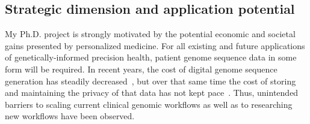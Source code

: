 \documentclass[a4paper,11pt]{article}
\begin{document}
\begin{refsection}
\section{Strategic dimension and application potential}
\begin{comment}
Elaborate the strategic dimension of your research, with regard to the 
(long-term) potential for innovative applications. 
Substantiate the PhD project’s strategic focus on economically relevant innovations. 

Justify how the chosen research approach (if successful) is the appropriate one to achieve the anticipated application(s) (potentially long term).

Elaborate the strategic importance of the potential applications to possible users (impact). 
Show how (if the project is successful) new products, services and/or processes may affect business of specific companies, a collective of companies and/or a sector and/or may be closely aligned with the Flemish science, technology and innovation transition priorities  (Flanders in transition. Priorities in Science, Technology and Innovation towards 2025) (socio-economic benefits). 

Societal impact should always be linked to a (in)direct (macro)economic benefit, e.g. cost reductions in health care, higher education level, environmental impact etc. should be positioned in an economic context.
\end{comment}
\smallskip

My Ph.D. project is strongly motivated by the potential economic and societal gains presented by personalized medicine. 
For all existing and future applications of genetically-informed precision health, patient genome sequence data in some form will be required.
In recent years, the cost of digital genome sequence generation has steadily decreased~\cite{wetterstrand_cost_2021}, but over that same time the cost of storing and maintaining the privacy of that data has not kept pace~\cite{}.
Thus, unintended barriers to scaling current clinical genomic workflows as well as to researching new workflows have been observed.


\end{refsection}
\end{document}
